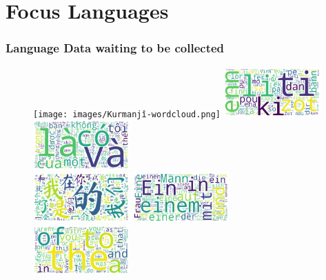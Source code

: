 \documentclass[aspectratio=169]{beamer}
\begin{document}
\section{Focus Languages}

\begin{frame}[fragile]
	\frametitle{Language Data waiting to be collected}
    \begin{figure}
	    \centering
	    \texttt{[image: images/Kurmanjî-wordcloud.png]}%
        \includegraphics[width=0.33\textwidth]{images/Morisien-wordcloud.png}%
        \includegraphics[width=0.33\textwidth]{images/Vietnamese-wordcloud.png}
        \\
        \includegraphics[width=0.33\textwidth]{images/Chinese-wordcloud.png}%
        \includegraphics[width=0.33\textwidth]{images/German-wordcloud.png}%
        \includegraphics[width=0.33\textwidth]{images/English-wordcloud.png}
	\end{figure}
\end{frame}
\end{document}
